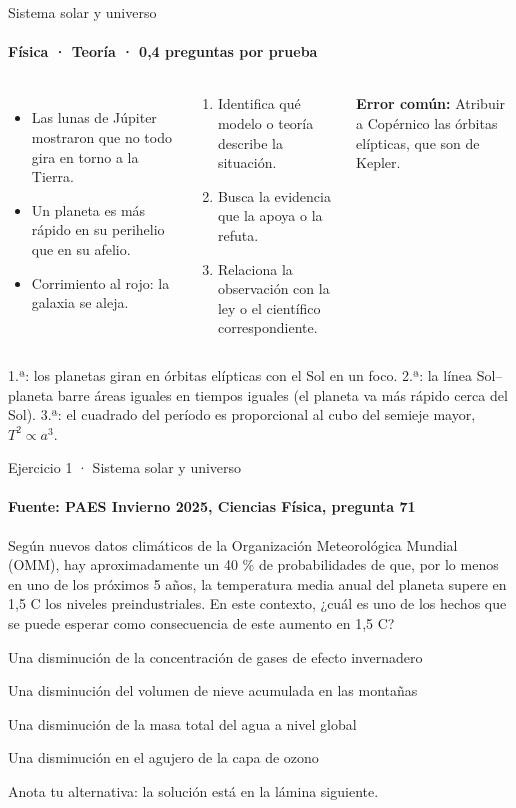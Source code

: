 \documentclass[aspectratio=169,11pt]{beamer}
\newcommand{\alternativa}[2]{\begin{opcion}\tecla{#1}\hspace{0.6em}#2\end{opcion}}
\newlength{\ajustealto}
\newenvironment{ajustar}[1][0.74\textheight]
  {\setlength{\ajustealto}{#1}\begin{lrbox}{\ajustecaja}\begin{minipage}{\textwidth}}
  {\end{minipage}\end{lrbox}%
   \ifdim\dimexpr\ht\ajustecaja+\dp\ajustecaja\relax>\ajustealto
     \resizebox*{!}{\ajustealto}{\usebox{\ajustecaja}}\else\usebox{\ajustecaja}\fi}
\begin{document}
\begin{frame}{Sistema solar y universo}
\label{tema-cs-universo}
\framesubtitle{Física · Teoría · 0,4 preguntas por prueba}
\begin{ajustar}
\begin{columns}[T,onlytextwidth]
\begin{itemize}\footnotesize
\item Las lunas de Júpiter mostraron que no todo gira en torno a la Tierra.
\item Un planeta es más rápido en su perihelio que en su afelio.
\item Corrimiento al rojo: la galaxia se aleja.
\end{itemize}
\begin{cajaregla}\scriptsize \begin{enumerate}\item Identifica qué modelo o teoría describe la situación.\item Busca la evidencia que la apoya o la refuta.\item Relaciona la observación con la ley o el científico correspondiente.\end{enumerate}\end{cajaregla}
\begin{notagris}\scriptsize \textbf{Error común:} Atribuir a Copérnico las órbitas elípticas, que son de Kepler.\end{notagris}
\end{columns}
\begin{cajaclave}\footnotesize
1.ª: los planetas giran en órbitas elípticas con el Sol en un foco. 2.ª: la línea Sol–planeta barre áreas iguales en tiempos iguales (el planeta va más rápido cerca del Sol). 3.ª: el cuadrado del período es proporcional al cubo del semieje mayor, $T^2\propto a^3$.
\end{cajaclave}
\end{ajustar}
\end{frame}

\begin{frame}{Ejercicio 1 · Sistema solar y universo}
\framesubtitle{Fuente: PAES Invierno 2025, Ciencias Física, pregunta 71}
\begin{ajustar}[0.7\textheight]
{\small Según nuevos datos climáticos de la Organización Meteorológica Mundial (OMM), hay aproximadamente un 40 \% de probabilidades de que, por lo menos en uno de los próximos 5 años, la temperatura media anual del planeta supere en 1,5 \textdegree{}C los niveles preindustriales. En este contexto, ¿cuál es uno de los hechos que se puede esperar como consecuencia de este aumento en 1,5 \textdegree{}C?}
\vspace{0.4em}
\alternativa{A}{Una disminución de la concentración de gases de efecto invernadero}
\alternativa{B}{Una disminución del volumen de nieve acumulada en las montañas}
\alternativa{C}{Una disminución de la masa total del agua a nivel global}
\alternativa{D}{Una disminución en el agujero de la capa de ozono}
\end{ajustar}
\vfill{\tiny\color{zinc500}\hfill Anota tu alternativa: la solución está en la lámina siguiente.}
\end{frame}
\end{document}

